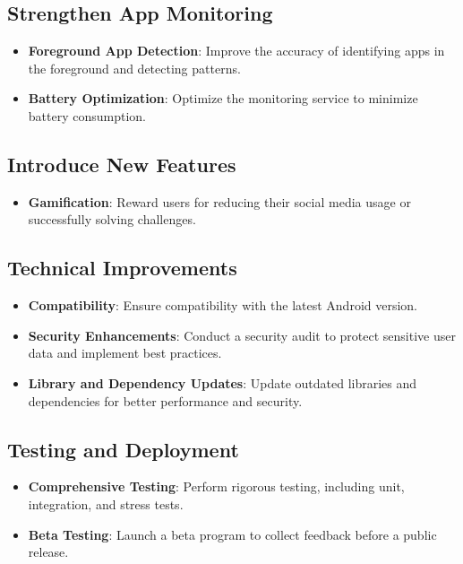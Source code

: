 \documentclass[12pt]{article}
\begin{document}
    \subsection{Strengthen App Monitoring}
    \begin{itemize}
        \item \textbf{Foreground App Detection}: Improve the accuracy of identifying apps in the foreground and detecting patterns.
        \item \textbf{Battery Optimization}: Optimize the monitoring service to minimize battery consumption.
    \end{itemize}
    
    \subsection{Introduce New Features}
    \begin{itemize}
        \item \textbf{Gamification}: Reward users for reducing their social media usage or successfully solving challenges.
        \end{itemize}
    
    \subsection{Technical Improvements}
    \begin{itemize}
        \item \textbf{Compatibility}: Ensure compatibility with the latest Android version.
        \item \textbf{Security Enhancements}: Conduct a security audit to protect sensitive user data and implement best practices.
        \item \textbf{Library and Dependency Updates}: Update outdated libraries and dependencies for better performance and security.
    \end{itemize}
    
    \subsection{Testing and Deployment}
    \begin{itemize}
        \item \textbf{Comprehensive Testing}: Perform rigorous testing, including unit, integration, and stress tests.
        \item \textbf{Beta Testing}: Launch a beta program to collect feedback before a public release.
    \end{itemize}
    
\end{document}
